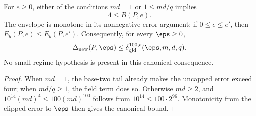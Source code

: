 \begin{theorem}
\label{thm:pauli-final-full-domain-support}
\leanok
{}
For $e\geq0$, either of the conditions $md=1$ or $1\leq md/q$ implies
\[
 4\leq B(P,e).
\]
The envelope is monotone in its nonnegative error argument: if
$0\leq e\leq e'$, then $E_b(P,e)\leq E_b(P,e')$.  Consequently, for every
$\eps\geq0$,
\[
 \Delta_{\mathrm{new}}(P,\eps)
 \leq\delta_{\mathrm{qld}}^{100,b}(\eps,m,d,q).
\]
No small-regime hypothesis is present in this canonical consequence.
\end{theorem}
\begin{proof}
\leanok
{}
When $md=1$, the base-two tail already makes the uncapped error exceed four;
when $md/q\geq1$, the field term does so.  Otherwise $md\geq2$, and
$10^{14}(md)^4\leq100(md)^{100}$ follows from
$10^{14}\leq100\cdot2^{96}$.  Monotonicity from the clipped error to $\eps$
then gives the canonical bound.
\end{proof}

